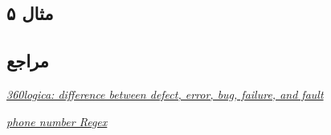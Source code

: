 {\subsection*{مثال ۵}



\subsection*{مراجع}

\begin{latin}
	\begingroup
	\renewcommand{\section}[2]{}%
	
\begin{thebibliography}{9}
	\textit{\href{https://www.360logica.com/blog/difference-between-defect-error-bug-failure-and-fault/
	}{360logica: difference between defect, error, bug, failure, and fault}}

	\textit{\href{https://www.datisnetwork.com/phone-number-regex.html}{phone number Regex}}

\end{thebibliography}
\endgroup
\end{latin}

}

